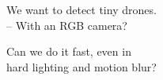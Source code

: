\documentclass[aspectratio=169,11pt]{beamer}
\begin{document}

\begin{frame}[plain]
  \vspace{2.4cm}
  \hspace{1.2cm}%
  \begin{minipage}{0.85\paperwidth}
    {\selectfont\fontsize{40}{48}\selectfont
      We want to detect tiny drones.\\[0.2em]
      -- With an RGB camera?}
  \end{minipage}
\end{frame}

\begin{frame}[plain]
  \vspace{2.4cm}
  \hspace{1.2cm}%
  \begin{minipage}{0.85\paperwidth}
    {\selectfont\fontsize{40}{48}\selectfont
      Can we do it fast, even in\\
      hard lighting and motion blur?}
  \end{minipage}
\end{frame}
\end{document}
